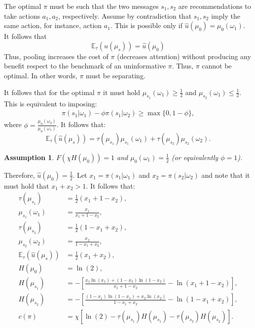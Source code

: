 \documentclass[12pt,a4paper]{article}
\newtheorem{assumption}{Assumption}
\begin{document}
The optimal $\pi$ must be such that the two messages $s_1,s_2$ are recommendations to take actions $a_1,a_2$, respectively. Assume by contradiction that $s_1,s_2$ imply the same action, for instance, action $a_1$. This is possible only if $\hat{u}(\mu_0)=\mu_0(\omega_1)$. It follows that
$$\mathbb{E}_\tau(\hat{u}(\mu_s)) =\hat{u}(\mu_0)$$
Thus, pooling increases the cost of $\pi$ (decreases attention) without producing any benefit respect to the benchmark of an uninformative $\pi$. Thus, $\pi$ cannot be optimal. In other words, $\pi$ must be separating. 

It follows that for the optimal $\pi$ it must hold $\mu_{s_1}(\omega_1)\geq\frac{1}{2}$ and $\mu_{s_2}(\omega_1)\leq\frac{1}{2}$. This is equivalent to imposing:
\begin{align}
    \pi(s_1|\omega_1)-\phi\pi(s_1|\omega_2)\geq \max\{0,1-\phi\},
\end{align}
where $\phi=\frac{\mu_0(\omega_2)}{\mu_0(\omega_1)}$. It follows that:
\begin{equation}
    \mathbb{E}_\tau(\hat{u}(\mu_s)) = \tau(\mu_{s_1})\mu_{s_1}(\omega_1) + \tau(\mu_{s_2})\mu_{s_2}(\omega_2).
\end{equation}

\begin{assumption}
\label{Ass1}
    $F(\chi H(\mu_0))=1$ and $\mu_0(\omega_1)=\frac{1}{2}$ (or equivalently $\phi=1$).
\end{assumption}

Therefore, $\hat{u}(\mu_0) = \frac{1}{2}$. Let $x_1=\pi(s_1|\omega_1)$ and $x_2=\pi(s_2|\omega_2)$ and note that it must hold that $x_1+x_2>1$. It follows that:
\begin{align}
    \label{taus1}
    \tau(\mu_{s_1}) & = \frac{1}{2}(x_1 + 1-x_2), \\
    \label{mus1}
    \mu_{s_1}(\omega_1) & = \frac{x_1}{x_1 + 1-x_2}, \\
    \label{taus2}
    \tau(\mu_{s_2}) & = \frac{1}{2}(1-x_1 + x_2), \\
    \label{mus2}
    \mu_{s_2}(\omega_2) & = \frac{x_2}{1-x_1 + x_2}, \\
     \mathbb{E}_\tau(\hat{u}(\mu_s)) & = \frac{1}{2}(x_1+x_2), \\
     H(\mu_0) & = \ln(2), \\
     H(\mu_{s_1}) & = -\left[\frac{x_1\ln(x_1)+(1-x_2)\ln(1-x_2)}{x_1+1-x_2}-\ln(x_1+1-x_2)\right], \\
     H(\mu_{s_2}) & = -\left[\frac{(1-x_1)\ln(1-x_1)+x_2\ln(x_2)}{1-x_1+x_2}-\ln(1-x_1+x_2)\right], \\
     c(\pi) & = \chi\left[\ln(2)-\tau(\mu_{s_1})H(\mu_{s_1})-\tau(\mu_{s_2})H(\mu_{s_2})\right].
\end{align}
\end{document}
